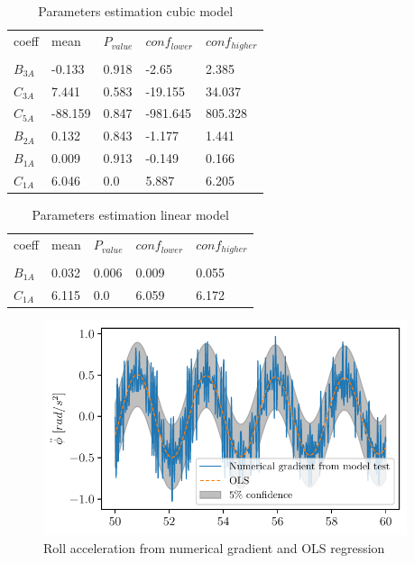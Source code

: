 \begin{table}[H]
\scriptsize
\center
\caption{Parameters estimation cubic model}
\label{tab:parameters3}
\begin{tabular}{|l|l|l|l|l|}
\hline\addlinespace
coeff & mean & $P_{value}$ & $conf_{lower}$ & $conf_{higher}$\\
&  &  &  & \\
\hline$B_{3A}$ & -0.133 & 0.918 & -2.65 & 2.385\\
$C_{3A}$ & 7.441 & 0.583 & -19.155 & 34.037\\
$C_{5A}$ & -88.159 & 0.847 & -981.645 & 805.328\\
$B_{2A}$ & 0.132 & 0.843 & -1.177 & 1.441\\
$B_{1A}$ & 0.009 & 0.913 & -0.149 & 0.166\\
$C_{1A}$ & 6.046 & 0.0 & 5.887 & 6.205\\
\hline
\end{tabular}
\end{table}
\begin{table}[H]
\scriptsize
\center
\caption{Parameters estimation linear model}
\label{tab:parameters4}
\begin{tabular}{|l|l|l|l|l|}
\hline\addlinespace
coeff & mean & $P_{value}$ & $conf_{lower}$ & $conf_{higher}$\\
&  &  &  & \\
\hline$B_{1A}$ & 0.032 & 0.006 & 0.009 & 0.055\\
$C_{1A}$ & 6.115 & 0.0 & 6.059 & 6.172\\
\hline
\end{tabular}
\end{table}
\begin{figure}[H]
\begin{center}\includegraphics[width = 0.95\textwidth]{figures/roll_acceleration_ols.pdf}\end{center}
\vspace{-0.7cm}
\caption{Roll acceleration from numerical gradient and OLS regression}
\label{fig:roll_acceleration_ols}
\end{figure}
